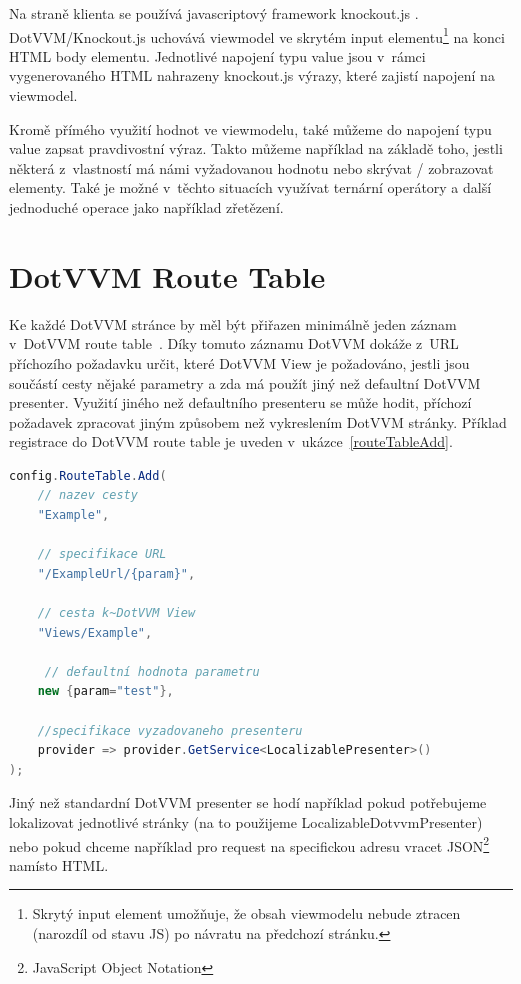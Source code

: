 Na straně klienta se používá javascriptový framework knockout.js . DotVVM/Knockout.js uchovává viewmodel ve skrytém input elementu\footnote{Skrytý input element umožňuje, že obsah viewmodelu nebude ztracen (narozdíl od stavu JS) po návratu na předchozí stránku.} na konci HTML body elementu. Jednotlivé napojení typu value jsou v~rámci vygenerovaného HTML nahrazeny knockout.js výrazy, které zajistí napojení na viewmodel.

Kromě přímého využití hodnot ve viewmodelu, také můžeme do napojení typu value zapsat pravdivostní výraz. Takto můžeme například na základě toho, jestli některá z~vlastností má námi vyžadovanou hodnotu nebo skrývat / zobrazovat elementy. Také je možné v~těchto situacích využívat ternární operátory a další jednoduché operace jako například zřetězení. 
\section{DotVVM Route Table}
Ke každé DotVVM stránce by měl být přiřazen minimálně jeden záznam v~DotVVM route table~\cite{DotVVM-Routing}. Díky tomuto záznamu DotVVM dokáže z~URL příchozího požadavku určit, které DotVVM View je požadováno, jestli jsou součástí cesty nějaké parametry a zda má použít jiný než defaultní DotVVM presenter. Využití jiného než defaultního presenteru se může hodit, příchozí požadavek zpracovat jiným způsobem než vykreslením DotVVM stránky. Příklad registrace do DotVVM route table je uveden v~ukázce~\ref{routeTableAdd}.
\begin{lstlisting}[language=C#, caption=Ukázka přidání záznamu do DotVVM route table v~rámci DotvvmStartup.cs.,label=routeTableAdd,captionpos=t]
config.RouteTable.Add(
    // nazev cesty
    "Example",
    
    // specifikace URL
    "/ExampleUrl/{param}",
    
    // cesta k~DotVVM View
    "Views/Example", 
    
     // defaultní hodnota parametru
    new {param="test"},
    
    //specifikace vyzadovaneho presenteru
    provider => provider.GetService<LocalizablePresenter>()
);
\end{lstlisting}

Jiný než standardní DotVVM presenter se hodí například pokud potřebujeme lokalizovat jednotlivé stránky (na to použijeme LocalizableDotvvmPresenter) nebo pokud chceme například pro request na specifickou adresu vracet JSON\footnote{JavaScript Object Notation} namísto HTML.
